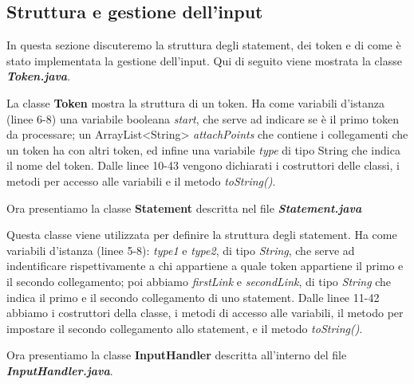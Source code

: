 \subsection{Struttura e gestione dell'input}
In questa sezione discuteremo la struttura degli statement, dei token e di come è stato implementata la gestione dell'input. Qui di seguito viene mostrata la classe \textbf{\textit{Token.java}}.

La classe \textbf{Token} mostra la struttura di un token. Ha come variabili d'istanza (linee 6-8) una variabile booleana \textit{start}, che serve ad indicare se è il primo token da processare; un ArrayList<String> \textit{attachPoints} che contiene i collegamenti che un token ha con altri token, ed infine una variabile \textit{type} di tipo String che indica il nome del token. Dalle linee 10-43 vengono dichiarati i costruttori delle classi, i metodi per accesso alle variabili e il metodo \textit{toString()}.\par
Ora presentiamo la classe \textbf{Statement} descritta nel file \textbf{\textit{Statement.java}}

Questa classe viene utilizzata per definire la struttura degli statement. Ha come variabili d'istanza (linee 5-8): \textit{type1} e \textit{type2}, di tipo \textit{String}, che serve ad indentificare rispettivamente a chi appartiene a quale token appartiene il primo e il secondo collegamento; poi abbiamo \textit{firstLink} e \textit{secondLink}, di tipo \textit{String} che indica il primo e il secondo collegamento di uno statement. Dalle linee 11-42 abbiamo i costruttori della classe, i metodi di accesso alle variabili, il metodo per impostare il secondo collegamento allo statement, e il metodo \textit{toString()}.\par
Ora presentiamo la classe \textbf{InputHandler} descritta all'interno del file \textbf{\textit{InputHandler.java}}.

